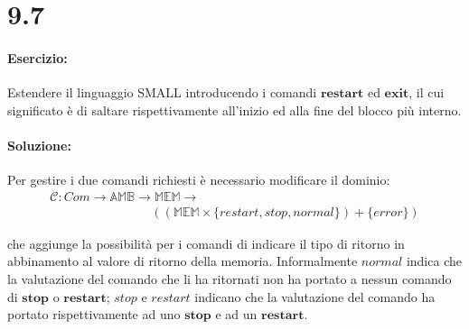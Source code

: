 \documentclass[a4paper,twosides]{report}
\begin{document}
\section*{9.7}
\paragraph{Esercizio:} Estendere il linguaggio SMALL introducendo i
comandi $\mathbf{restart}$ ed $\mathbf{exit}$, il cui significato è di 
saltare rispettivamente all’inizio ed alla fine del blocco più
interno.

\paragraph{Soluzione:} Per gestire i due comandi richiesti \`e
necessario modificare il dominio:
\begin{equation*}
  \begin{multlined}  
    \mathcal{C}:Com \longrightarrow{} \mathbb{AMB}
    \longrightarrow{} \mathbb{MEM} \longrightarrow{}\\
    \qquad\qquad\qquad\qquad((\mathbb{MEM}\times\{restart, stop, normal\})+\{error\})
  \end{multlined}  
\end{equation*}

che aggiunge la possibilit\`a per i comandi di indicare il tipo di
ritorno in abbinamento al valore di ritorno della
memoria. Informalmente $normal$ indica che la valutazione del comando
che li ha ritornati
non ha portato a nessun comando di $\mathbf{stop}$ o
$\mathbf{restart}$; $stop$ e $restart$ indicano che la valutazione del
comando ha portato rispettivamente ad uno $\mathbf{stop}$ e ad un
$\mathbf{restart}$.
\end{document}

